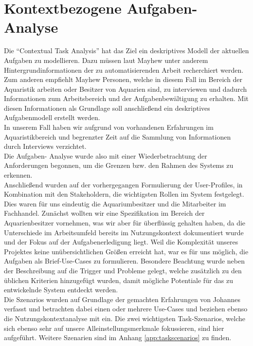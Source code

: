 \chapter{Kontextbezogene Aufgaben-Analyse}\label{taskanalysis}

Die ``Contextual Task Analysis'' hat das Ziel ein deskriptives Modell der aktuellen Aufgaben zu modellieren. Dazu müssen laut Mayhew unter anderem Hintergrundinformationen der zu automatisierenden Arbeit recherchiert werden. Zum anderen empfiehlt Mayhew Personen, welche in diesem Fall im Bereich der Aquaristik arbeiten oder Besitzer von Aquarien sind, zu interviewen und dadurch Informationen zum Arbeitsbereich und der Aufgabenbewältigung zu erhalten. Mit diesen Informationen als Grundlage soll anschließend ein deskriptives Aufgabenmodell erstellt werden. \\

In unserem Fall haben wir aufgrund von  vorhandenen Erfahrungen im Aquaristikbereich und begrenzter Zeit auf die Sammlung von Informationen durch Interviews verzichtet. \\ 

Die Aufgaben- Analyse wurde also mit einer Wiederbetrachtung der Anforderungen begonnen, um die Grenzen bzw. den Rahmen des Systems zu erkennen. \\

Anschließend wurden auf der vorhergegangen Formulierung der User-Profiles, in Kombination mit den Stakeholdern, die wichtigsten Rollen im System festgelegt. Dies waren für uns eindeutig die Aquariumbesitzer und die Mitarbeiter im Fachhandel. Zunächst wollten wir eine Spezifikation im Bereich der Aquarienbesitzer vornehmen, was wir aber für überflüssig gehalten haben, da die Unterschiede im Arbeitsumfeld bereits im Nutzungskontext dokumentiert wurde und der Fokus auf der Aufgabenerledigung liegt. Weil die Komplexität unseres Projektes  keine unübersichtlichen Größen erreicht hat, war es für uns möglich, die Aufgaben als Brief-Use-Cases zu formulieren. Besondere Beachtung wurde neben der Beschreibung auf die Trigger und Probleme gelegt, welche zusätzlich zu den üblichen Kriterien hinzugefügt wurden, damit mögliche Potentiale für das zu entwickelnde System entdeckt werden. \\



Die Szenarios wurden auf Grundlage der gemachten Erfahrungen von Johannes verfasst und betrachten dabei einen oder mehrere Use-Cases und beziehen ebenso die Nutzungskontextanalyse mit ein. Die zwei wichtigsten Task-Szenarios, welche sich ebenso sehr auf unsere Alleinstellungsmerkmale fokussieren, sind hier aufgeführt. Weitere Szenarien sind im Anhang \ref{app:taskscenarios} zu finden.\\

